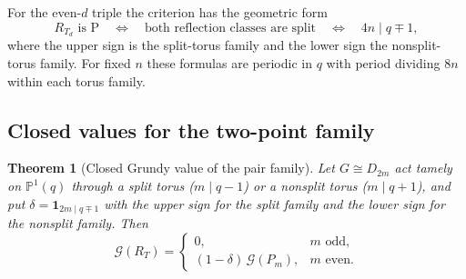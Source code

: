 \documentclass[11pt]{article}
\newtheorem{theorem}{Theorem}[section]
\theoremstyle{definition}
\theoremstyle{remark}
\newcommand{\PP}{\mathbb{P}}
\newcommand{\Grundy}{\mathcal{G}}
\newcommand{\Mob}{M}
\newif\ifdraftnotes
\newcommand{\phasenote}[2]{%
  \ifdraftnotes
    \par\smallskip\noindent
    \fbox{\parbox{0.96\linewidth}{\footnotesize\textbf{[#1 owed]}\ #2}}%
    \par\smallskip
  \fi}
\begin{document}
\phasenote{C307}{\textbf{Correctness hazard 1 --- blocking.} For even $h$ a second $D_{4n}$
conjugacy class with all-nonsplit reflections ($t=0$) exists, first at $q=7$, $D_8$ acting freely
with board $\Mob_8$ and value $1$ against the boxed $0$. C281 established that
equations~\eqref{eq:split-odd}--\eqref{eq:nonsplit-even} and
Corollary~\ref{cor:pn-congruences} require a $t$-case split, and that for odd $d$ exactly one of the
two classes is an N-position. C307 must apply that correction here before any polishing; the
formulas above are migrated verbatim from the source manuscript and are known to be incomplete as
stated. The $\S14$ pair value formula survives unchanged ($t\equiv1+\delta\bmod2$).}

For the even-$d$ triple the criterion has the geometric form
\begin{equation}
  R_{T_d}\text{ is P}
  \quad\Longleftrightarrow\quad
  \text{both reflection classes are split}
  \quad\Longleftrightarrow\quad
  4n\mid q\mp1,
  \label{eq:geometric-P}
\end{equation}
where the upper sign is the split-torus family and the lower sign the nonsplit-torus family. For
fixed $n$ these formulas are periodic in $q$ with period dividing $8n$ within each torus family.

\subsection{Closed values for the two-point family}

\begin{theorem}[Closed Grundy value of the pair family]
\label{thm:pair-closed}
Let $G\cong D_{2m}$ act tamely on $\PP^1(q)$ through a split torus ($m\mid q-1$) or a nonsplit torus
($m\mid q+1$), and put $\delta=\mathbf 1_{2m\mid q\mp1}$ with the upper sign for the split family
and the lower sign for the nonsplit family. Then
\begin{equation}
  \Grundy(R_T)=
  \begin{cases}
    0, & m\text{ odd},\\
    (1-\delta)\,\Grundy(P_m), & m\text{ even}.
  \end{cases}
  \label{eq:pair-closed}
\end{equation}
\end{theorem}
\end{document}
